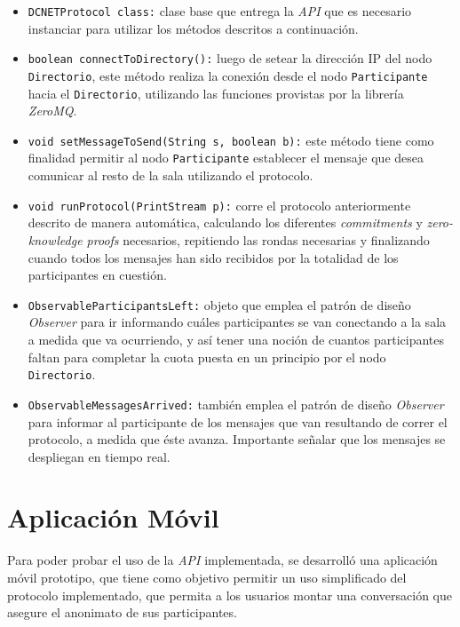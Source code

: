 \begin{itemize}
    \item \texttt{DCNETProtocol class:} clase base que entrega la \emph{API} 
    que es necesario instanciar para utilizar los métodos descritos a 
    continuación. 
    \item \texttt{boolean connectToDirectory():} luego de setear la dirección 
    IP del nodo \texttt{Directorio}, este método realiza la conexión desde el 
    nodo \texttt{Participante} hacia el \texttt{Directorio}, utilizando las 
    funciones provistas por la librería \emph{ZeroMQ}.
    \item \texttt{void setMessageToSend(String s, boolean b):} este método 
    tiene como finalidad permitir al nodo \texttt{Participante} establecer el 
    mensaje que desea comunicar al resto de la sala utilizando el protocolo. 
    \item \texttt{void runProtocol(PrintStream p):} corre el protocolo 
    anteriormente descrito de manera automática, calculando los diferentes 
    \emph{commitments} y \emph{zero-knowledge proofs} necesarios, repitiendo 
    las rondas necesarias y finalizando cuando todos los mensajes han sido 
    recibidos por la totalidad de los participantes en cuestión.
    \item \texttt{ObservableParticipantsLeft:} objeto que emplea el patrón de 
    diseño \emph{Observer} para ir informando cuáles participantes se van 
    conectando a la sala a medida que va ocurriendo, y así tener una noción de 
    cuantos participantes faltan para completar la cuota puesta en un 
    principio por el nodo \texttt{Directorio}.
    \item \texttt{ObservableMessagesArrived:} también emplea el patrón de 
    diseño \emph{Observer} para informar al participante de los mensajes que 
    van resultando de correr el protocolo, a medida que éste avanza. 
    Importante señalar que los mensajes se despliegan en tiempo real.
\end{itemize}

\section{Aplicación Móvil}

Para poder probar el uso de la \emph{API} implementada, se desarrolló una 
aplicación móvil prototipo, que tiene como objetivo permitir un uso 
simplificado 
del protocolo implementado, que permita a los usuarios montar una conversación 
que asegure el anonimato de sus participantes.

